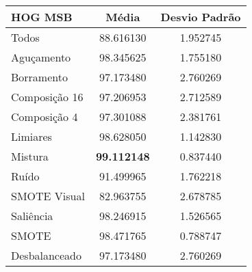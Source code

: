 

\begin{table}[!htbp]
\centering
\caption{}
\label{tab:resultados:x:melhor}
\begin{tabular}{|l|c|c|}
\hline
\textbf{HOG MSB} & \textbf{Média}     & \textbf{Desvio Padrão} \\ \hline
   Todos        &  88.616130 &  1.952745  \\ \hline
  Aguçamento    &  98.345625 &  1.755180  \\ \hline
  Borramento    &  97.173480 &  2.760269  \\ \hline
  Composição 16 &  97.206953 &  2.712589  \\ \hline
  Composição 4  &  97.301088 &  2.381761  \\ \hline
  Limiares      &  98.628050 &  1.142830  \\ \hline
  Mistura       &  \textbf{99.112148} &  0.837440  \\ \hline
  Ruído         &  91.499965 &  1.762218  \\ \hline
  SMOTE Visual  &  82.963755 &  2.678785  \\ \hline
  Saliência     &  98.246915 &  1.526565  \\ \hline
 SMOTE          &  98.471765 &  0.788747  \\ \hline
Desbalanceado   &  97.173480 &  2.760269  \\ \hline
\end{tabular}
\end{table}

